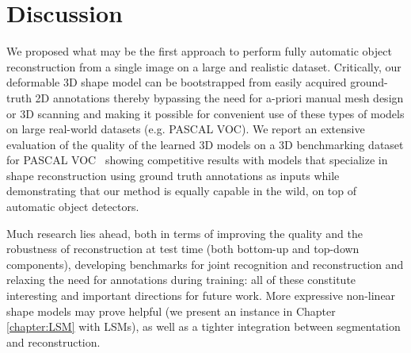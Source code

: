 \section{Discussion}
We proposed what may be the first approach to perform fully automatic object reconstruction from a single image on a large and realistic dataset. Critically, our deformable 3D shape model can be bootstrapped from easily acquired ground-truth 2D annotations thereby bypassing the need for a-priori manual mesh design or 3D scanning and making it possible for convenient use of these types of models on large real-world datasets (e.g. PASCAL VOC). We report an extensive evaluation of the quality of the learned 3D models on a 3D benchmarking dataset for PASCAL VOC~\cite{pascal3d} showing competitive results with models that specialize in shape reconstruction using ground truth annotations as inputs while demonstrating that our method is equally capable in the wild, on top of automatic object detectors.

Much research lies ahead, both in terms of improving the quality and the robustness of reconstruction at test time (both bottom-up and top-down components), developing benchmarks for joint recognition and reconstruction and relaxing the need for annotations during training: all of these constitute interesting and important directions for future work. More expressive non-linear shape models \cite{wu20143d} may prove helpful (we present an instance in Chapter \ref{chapter:LSM} with LSMs), as well as a tighter integration between segmentation and reconstruction.




